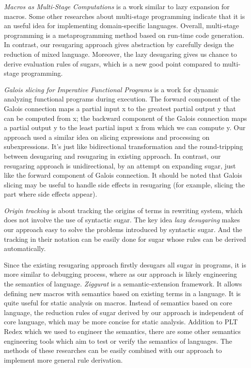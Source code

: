 \emph{Macros as Multi-Stage Computations} \cite{multistage} is a work similar to lazy expansion for macros. Some other researches\cite{modularstaging} about multi-stage programming\cite{MSP} indicate that it is an useful idea for implementing domain-specific languages. Overall, multi-stage programming is a metaprogramming method based on run-time code generation. In contrast, our resugaring approach gives abstraction by carefully design the reduction of mixed language. Moreover, the lazy desugaring gives us chance to derive evaluation rules of sugars, which is a new good point compared to multi-stage programming.

\emph{Galois slicing for Imperative Functional Programs} \cite{slicing} is a work for dynamic analyzing functional programs during execution. The forward component of the Galois connection maps a partial input x to the greatest partial output y that can be computed from x; the backward component of the Galois connection maps a partial output y to the least partial input x from which we can compute y. Our approach used a similar idea on slicing expressions and processing on subexpressions. It's just like bidirectional transformation \cite{bx} and the round-tripping between desugaring and resugaring in existing approach. In contrast, our resugaring approach is unidirectional, by an attempt on expanding sugar, just like the forward component of Galois connection. It should be noted that Galois slicing may be useful to handle side effects in resugaring (for example, slicing the part where side effects appear).

\emph{Origin tracking}\cite{origintracking} is about tracking the origins of terms in rewriting system, which does not involve the use of syntactic sugar. The key idea \emph{lazy desugaring} makes our approach easy to solve the problems introduced by syntactic sugar. And the tracking in their notation can be easily done for sugar whose rules can be derived automatically.

Since the existing resugaring approach firstly desugars all sugar in programs, it is more similar to debugging process, where as our approach is likely engineering the semantics of language. \emph{Ziggurat} \cite{Ziggurat} is a semantic-extension framework. It allows defining new macros with semantics based on existing terms in a language. It is quite useful for static analysis on macros. Instead of semantics based on core language, the reduction rules of sugar derived by our approach is independent of core language, which may be more concise for static analysis. Addition to PLT Redex\cite{SEwPR} which we used to engineer the semantics, there are some other semantics engineering tools \cite{dynsem,Ksemantic} which aim to test or verify the semantics of languages. The methods of these researches can be easily combined with our approach to implement more general rule derivation.
